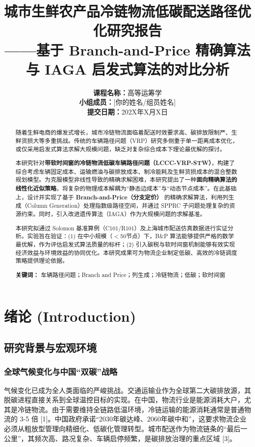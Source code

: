 \documentclass[11pt, a4paper]{article}
\title{\textbf{城市生鲜农产品冷链物流低碳配送路径优化研究报告}\\
\large ——基于 Branch-and-Price 精确算法与 IAGA 启发式算法的对比分析}
\author{\textbf{课程名称：}高等运筹学 \\ \textbf{小组成员：}[你的姓名/组员姓名] \\ \textbf{提交日期：}202X年X月X日}
\date{}
\begin{document}
\maketitle

\begin{abstract}
随着生鲜电商的爆发式增长，城市冷链物流面临着配送时效要求高、碳排放限制严、生鲜货损大等多重挑战。传统的车辆路径问题（VRP）研究多侧重于单一距离成本优化，或仅采用启发式算法求解大规模问题，缺乏对复杂综合成本下理论最优解的探讨。

本研究针对\textbf{带软时间窗的冷链物流低碳车辆路径问题（LCCC-VRP-STW）}，构建了综合考虑车辆固定成本、运输燃油与碳排放成本、制冷能耗及生鲜货损成本的混合整数规划模型。为克服模型非线性导致的精确求解困难，本研究提出了一种\textbf{面向精确算法的线性化近似策略}，将复杂的物理成本解耦为“静态边成本”与“动态节点成本”。在此基础上，设计并实现了基于 \textbf{Branch-and-Price（分支定价）} 的精确求解算法，利用列生成（Column Generation）处理指数级路径空间，并通过 SPPRC 子问题处理复杂的资源约束。同时，引入改进遗传算法（IAGA）作为大规模问题的求解基准。

本研究拟通过 Solomon 基准算例（C101/R101）及上海城市配送仿真数据进行实证分析。实验旨在验证：(1) 在中小规模（$<$50节点）下，B\&P 算法能够提供严格的数学最优解，作为评估启发式算法质量的标杆；(2) 引入碳税与软时间窗机制能够有效实现经济效益与环境效益的协同优化。本研究成果可为物流企业制定低碳、高效的冷链调度策略提供理论依据。

\vspace{0.5em}
\noindent \textbf{关键词：} 车辆路径问题；Branch and Price；列生成；冷链物流；低碳；软时间窗
\end{abstract}

\newpage
\tableofcontents
\newpage

\section{绪论 (Introduction)}

\subsection{研究背景与宏观环境}

\subsubsection{全球气候变化与中国“双碳”战略}
气候变化已成为全人类面临的严峻挑战。交通运输业作为全球第二大碳排放源，其脱碳进程直接关系到全球温控目标的实现。在中国，物流行业是能源消耗大户，尤其是冷链物流。由于需要维持全链路低温环境，冷链运输的能源消耗通常是普通物流的 3-5 倍 [1]。中国政府承诺“2030年碳达峰、2060年碳中和”，这要求物流企业必须从粗放型管理向精细化、低碳化管理转型。城市配送作为物流链条的“最后一公里”，其频次高、路况复杂、车辆启停频繁，是碳排放治理的重点区域 [3]。
\end{document}
